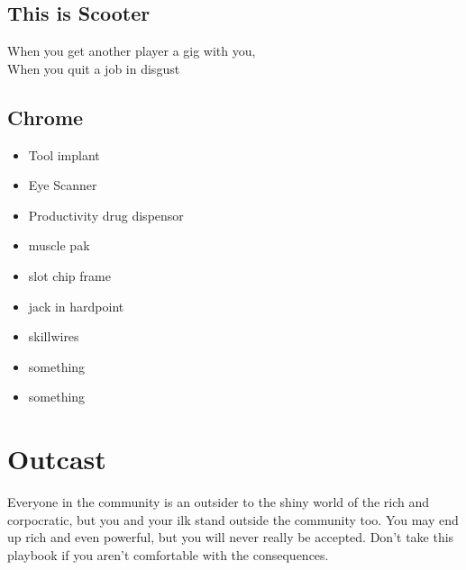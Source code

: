 \documentclass{tufte-book}
\begin{document}
\subsection{This is Scooter}
When you get another player a gig with you, \\
When you quit a job in disgust 


\subsection{Chrome}
\begin{multicols}{3}
\begin{itemize}
\item Tool implant
\item Eye Scanner
\item Productivity drug dispensor
\item muscle pak
\item slot chip frame
\item jack in hardpoint
\item skillwires
\item something
\item something
\end{itemize}
\end{multicols}




\section{Outcast} \label{sec:Outcast}

Everyone in the community is an outsider to the shiny world of the rich and corpocratic, but you and your ilk stand outside the community too. You may end up rich and even powerful, but you will never really be accepted. Don't take this playbook if you aren't comfortable with the consequences.

\end{document}

